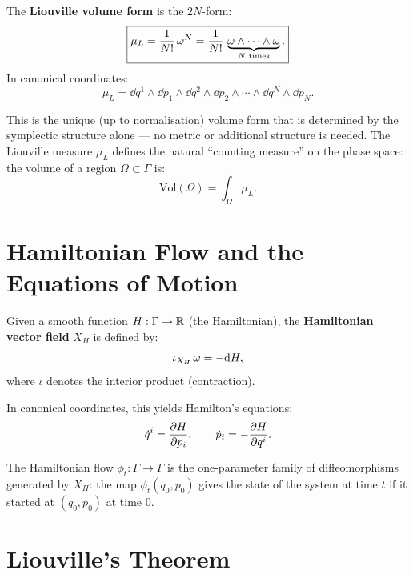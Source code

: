 \begin{definition}
The \textbf{Liouville volume form} is the $2N$-form:
\begin{equation}
\boxed{\mu_L = \frac{1}{N!}\,\omega^N = \frac{1}{N!}\,\underbrace{\omega \wedge \cdots \wedge \omega}_{N\text{ times}}.}
\end{equation}
In canonical coordinates:
\begin{equation}
\mu_L = \dd q^1 \wedge \dd p_1 \wedge \dd q^2 \wedge \dd p_2 \wedge \cdots \wedge \dd q^N \wedge \dd p_N.
\end{equation}
\end{definition}

This is the unique (up to normalisation) volume form that is determined by the symplectic structure alone --- no metric or additional structure is needed. The Liouville measure $\mu_L$ defines the natural ``counting measure'' on the phase space: the volume of a region $\Omega \subset \Gamma$ is:
\begin{equation}
\text{Vol}(\Omega) = \int_\Omega \mu_L.
\end{equation}

\section{Hamiltonian Flow and the Equations of Motion}

\begin{definition}
Given a smooth function $H: \Gamma \to \mathbb{R}$ (the Hamiltonian), the \textbf{Hamiltonian vector field} $X_H$ is defined by:
\begin{equation}
\iota_{X_H}\,\omega = -\dd H,
\end{equation}
where $\iota$ denotes the interior product (contraction).
\end{definition}

In canonical coordinates, this yields Hamilton's equations:
\begin{equation}
\dot{q}^i = \pdv{H}{p_i}, \qquad \dot{p}_i = -\pdv{H}{q^i}.
\end{equation}

The Hamiltonian flow $\phi_t: \Gamma \to \Gamma$ is the one-parameter family of diffeomorphisms generated by $X_H$: the map $\phi_t(q_0, p_0)$ gives the state of the system at time $t$ if it started at $(q_0, p_0)$ at time $0$.

\section{Liouville's Theorem}

